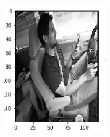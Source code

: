 \documentclass[12pt, letterpaper]{article}
\begin{document}
\begin{figure}[H]
    \centering
    \begin{subfigure}[b]{0.3\textwidth}
        \includegraphics[width=\textwidth]{vae-1.png}
        \label{fig:gull}
    \end{subfigure}
    ~ %
    \begin{subfigure}[b]{0.3\textwidth}

\end{subfigure}
\end{figure}
\end{document}
